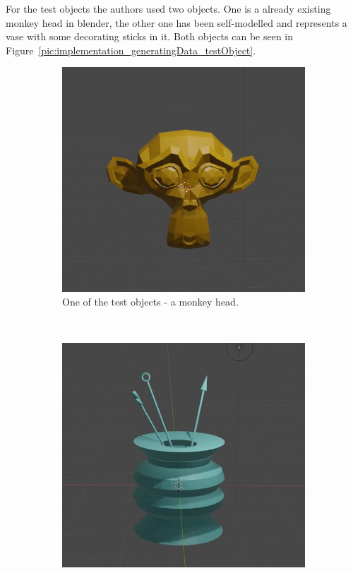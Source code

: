 For the test objects the authors used two objects. One is a already existing monkey head in blender, the other one has been self-modelled and represents a vase with some decorating sticks in it. Both objects can be seen in Figure~\ref{pic:implementation_generatingData_testObject}.

\begin{figure}[h!]
	\centering
	\begin{subfigure}[t]{0.5\textwidth}
		\centering
		\includegraphics[width=\textwidth]{img/implementation_generatingData_testObject1.jpg}
		\caption{One of the test objects - a monkey head.}
	\end{subfigure}%
	~ 
	\begin{subfigure}[t]{0.5\textwidth}
		\centering
		\includegraphics[width=\textwidth]{img/implementation_generatingData_testObject2.jpg}

\end{subfigure}
\end{figure}
